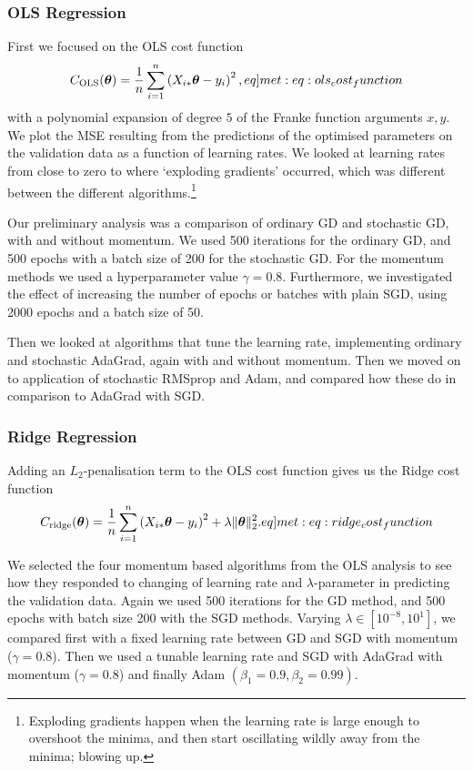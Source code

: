     \subsubsection{OLS Regression}
        First we focused on the OLS cost function
        \begin{align}
            \msub{C}{OLS}(\vec{\theta}) = \frac{1}{n}\sum_{i=1}^n \pclosed{X_{i*}\vec{\theta} - y_i}^2,
            \label[eq]{met:eq:ols_cost_function}
        \end{align}
        with a polynomial expansion of degree $5$ of the Franke function arguments $x,y$. We plot the MSE resulting from the predictions of the optimised parameters on the validation data as a function of learning rates. We looked at learning rates from close to zero to where `exploding gradients' occurred, which was different between the different algorithms.\footnote{Exploding gradients happen when the learning rate is large enough to overshoot the minima, and then start oscillating wildly away from the minima; blowing up.}

        Our preliminary analysis was a comparison of ordinary GD and stochastic GD, with and without momentum. We used 500 iterations for the ordinary GD, and 500 epochs with a batch size of 200 for the stochastic GD. For the momentum methods we used a hyperparameter value $\gamma=0.8$. Furthermore, we investigated the effect of increasing the number of epochs or batches with plain SGD, using 2000 epochs and a batch size of 50.

        Then we looked at algorithms that tune the learning rate, implementing ordinary and stochastic AdaGrad, again with and without momentum. Then we moved on to application of stochastic RMSprop and Adam, and compared how these do in comparison to AdaGrad with SGD.


    \subsubsection{Ridge Regression}
        Adding an $L_2$-penalisation term to the OLS cost function gives us the Ridge cost function
        \begin{align}
            \msub{C}{ridge}(\vec{\theta}) = \frac{1}{n}\sum_{i=1}^n \pclosed{X_{i*}\vec{\theta} - y_i}^2 + \lambda\norm[2]{\vec{\theta}}^2. 
            \label[eq]{met:eq:ridge_cost_function}
        \end{align}

        We selected the four momentum based algorithms from the OLS analysis to see how they responded to changing of learning rate and $\lambda$-parameter in predicting the validation data. Again we used 500 iterations for the GD method, and 500 epochs with batch size 200 with the SGD methods. Varying $\lambda \in [10^{-8}, 10^1]$, we compared first with a fixed learning rate between GD and SGD with momentum ($\gamma=0.8$). Then we used a tunable learning rate and SGD with AdaGrad with momentum ($\gamma=0.8$) and finally Adam $(\beta_1=0.9, \beta_2=0.99)$.

